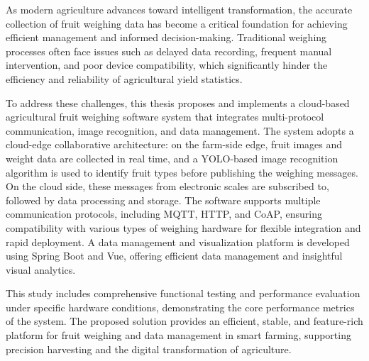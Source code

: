 As modern agriculture advances toward intelligent transformation, the accurate collection of fruit weighing data has become a critical foundation for achieving efficient management and informed decision-making. Traditional weighing processes often face issues such as delayed data recording, frequent manual intervention, and poor device compatibility, which significantly hinder the efficiency and reliability of agricultural yield statistics.

To address these challenges, this thesis proposes and implements a cloud-based agricultural fruit weighing software system that integrates multi-protocol communication, image recognition, and data management. The system adopts a cloud-edge collaborative architecture: on the farm-side edge, fruit images and weight data are collected in real time, and a YOLO-based image recognition algorithm is used to identify fruit types before publishing the weighing messages. On the cloud side, these messages from electronic scales are subscribed to, followed by data processing and storage. The software supports multiple communication protocols, including MQTT, HTTP, and CoAP, ensuring compatibility with various types of weighing hardware for flexible integration and rapid deployment. A data management and visualization platform is developed using Spring Boot and Vue, offering efficient data management and insightful visual analytics.

This study includes comprehensive functional testing and performance evaluation under specific hardware conditions, demonstrating the core performance metrics of the system. The proposed solution provides an efficient, stable, and feature-rich platform for fruit weighing and data management in smart farming, supporting precision harvesting and the digital transformation of agriculture.